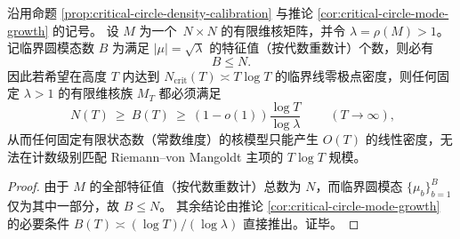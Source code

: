\begin{corollary}\label{cor:critical-circle-state-dimension-lower-bound}
沿用命题 \ref{prop:critical-circle-density-calibration} 与推论 \ref{cor:critical-circle-mode-growth} 的记号。
设 \(M\) 为一个 \(\,N\times N\) 的有限维核矩阵，并令 \(\lambda=\rho(M)>1\)。
记临界圆模态数 \(B\) 为满足 \(|\mu|=\sqrt{\lambda}\) 的特征值（按代数重数计）个数，则必有
\[
\boxed{\;B\le N.\;}
\]
因此若希望在高度 \(T\) 内达到 \(N_{\mathrm{crit}}(T)\asymp T\log T\) 的临界线零极点密度，则任何固定 \(\lambda>1\) 的有限维核族 \(M_T\) 都必须满足
\[
\boxed{\;N(T)\ \ge\ B(T)\ \ge\ (1-o(1))\frac{\log T}{\log\lambda}\;}
\qquad(T\to\infty),
\]
从而任何固定有限状态数（常数维度）的核模型只能产生 \(O(T)\) 的线性密度，无法在计数级别匹配 Riemann--von Mangoldt 主项的 \(T\log T\) 规模。
\end{corollary}

\begin{proof}
由于 \(M\) 的全部特征值（按代数重数计）总数为 \(N\)，而临界圆模态 \(\{\mu_b\}_{b=1}^B\) 仅为其中一部分，故 \(B\le N\)。
其余结论由推论 \ref{cor:critical-circle-mode-growth} 的必要条件 \(B(T)\asymp (\log T)/(\log\lambda)\) 直接推出。证毕。
\end{proof}

\endinput
